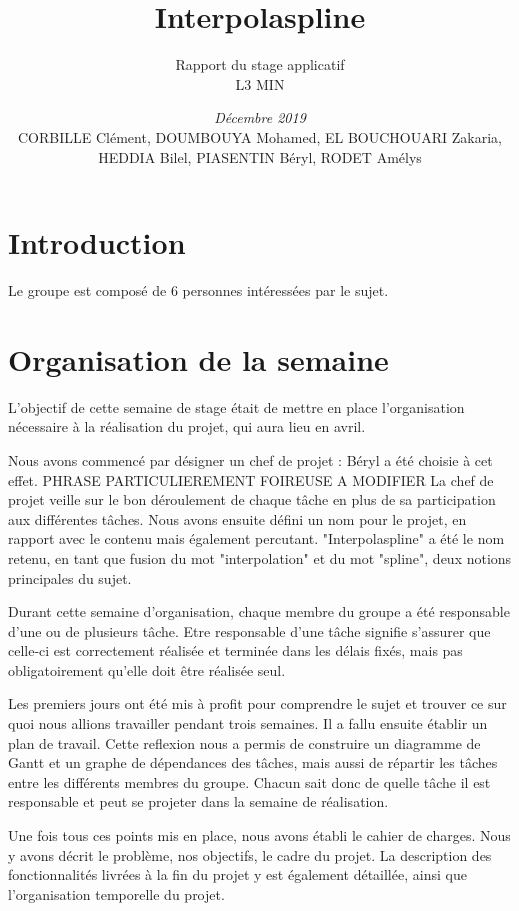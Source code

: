 \documentclass[a4paper,10pt]{article} %
\title{\textbf{Interpolaspline}}
\author{Rapport du stage applicatif\\ L3 MIN}
\date{\emph{Décembre 2019}\\CORBILLE Clément, DOUMBOUYA Mohamed, EL BOUCHOUARI Zakaria, HEDDIA Bilel, PIASENTIN Béryl, RODET Amélys}
\begin{document}

\maketitle %
\tableofcontents %

\newpage

\section*{Introduction}

Le groupe est composé de 6 personnes intéressées par le sujet.

\section{Organisation de la semaine}

L'objectif de cette semaine de stage était de mettre en place l'organisation nécessaire à la réalisation du projet, qui aura lieu en avril.

Nous avons commencé par désigner un chef de projet : Béryl a été choisie à cet effet. PHRASE PARTICULIEREMENT FOIREUSE A MODIFIER La chef de projet veille sur le bon déroulement de chaque tâche en plus de sa participation aux différentes tâches. Nous avons ensuite défini un nom pour le projet, en rapport avec le contenu mais également percutant. "Interpolaspline" a été le nom retenu, en tant que fusion du mot "interpolation" et du mot "spline", deux notions principales du sujet.

Durant cette semaine d'organisation, chaque membre du groupe a été responsable d’une ou de plusieurs tâche. Etre responsable d'une tâche signifie s'assurer que celle-ci est correctement réalisée et terminée dans les délais fixés, mais pas obligatoirement qu'elle doit être réalisée seul.

Les premiers jours ont été mis à profit pour comprendre le sujet et trouver ce sur quoi nous allions travailler pendant trois semaines. Il a fallu ensuite établir un plan de travail. Cette reflexion nous a permis de construire un diagramme de Gantt et un graphe de dépendances des tâches, mais aussi de répartir les tâches entre les différents membres du groupe. Chacun sait donc de quelle tâche il est responsable et peut se projeter dans la semaine de réalisation.

Une fois tous ces points mis en place, nous avons établi le cahier de charges. Nous y avons décrit le problème, nos objectifs, le cadre du projet. La description des fonctionnalités livrées à la fin du projet y est également détaillée, ainsi que l'organisation temporelle du projet. 
\end{document}
